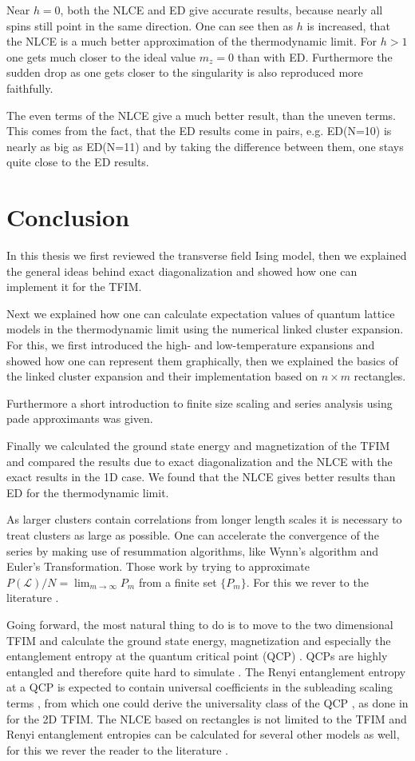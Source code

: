 \documentclass[a4paper,12pt]{article}
\begin{document}
Near $h = 0$, both the NLCE and ED give accurate results, because
nearly all spins still point in the same direction. One can see then as $h$ is
increased, that the NLCE is a much better approximation of the
thermodynamic limit. For $h>1$ one gets much closer to the ideal value
$m_z = 0$ than with ED. Furthermore the sudden drop as one gets closer
to the singularity is also reproduced more faithfully.

The even terms of the NLCE give a much better result, than the uneven
terms. This comes from the fact, that the ED results come in pairs,
e.g. ED(N=10) is nearly as big as ED(N=11) and by taking the
difference between them, one stays quite close to the ED results.

\section{Conclusion}
In this thesis we first reviewed the transverse field Ising model,
then we explained the general ideas behind exact diagonalization and
showed how one can implement it for the TFIM.

Next we explained how one can calculate expectation values of quantum
lattice models in the thermodynamic limit using the numerical linked
cluster expansion. For this, we first introduced the high- and
low-temperature expansions and showed how one can represent them graphically,
then we explained the basics of the linked cluster expansion and their
implementation based on $n \times m$ rectangles.

Furthermore a short introduction to finite size scaling and series
analysis using pade approximants was given.

Finally we calculated the ground state energy and magnetization of the
TFIM and compared the results due to exact diagonalization and the
NLCE with the exact results in the 1D case. We found that the NLCE
gives better results than ED for the thermodynamic limit.

As larger clusters contain correlations from longer length scales it
is necessary to treat clusters as large as possible. One can
accelerate the convergence of the series by making use of resummation
algorithms, like Wynn's algorithm and Euler's Transformation. Those
work by trying to approximate $P(\mathcal{L})/N = \lim_{m \to \infty}
P_m$ from a finite set $\{P_m\}$. For this we rever to the literature \cite{Rigol}.

Going forward, the most natural thing to do is to move to the two
dimensional TFIM and calculate the ground state energy, magnetization
and especially the entanglement entropy at the quantum critical point (QCP)
\cite{sachdev}. QCPs are highly entangled and therefore quite hard to
simulate \cite{vidal}. The Renyi entanglement entropy at a QCP is
expected to contain universal coefficients in the subleading scaling
terms \cite{Huerta}, from which one could derive the universality
class of the QCP \cite{Kallin,Melko}, as done in \cite{Kallin} for
the 2D TFIM. The NLCE based on rectangles is not limited to the TFIM and Renyi
entanglement entropies can be calculated for several other models as
well, for this we rever the reader to the literature
\cite{Kallin,Melko,melko1}.
\end{document}
